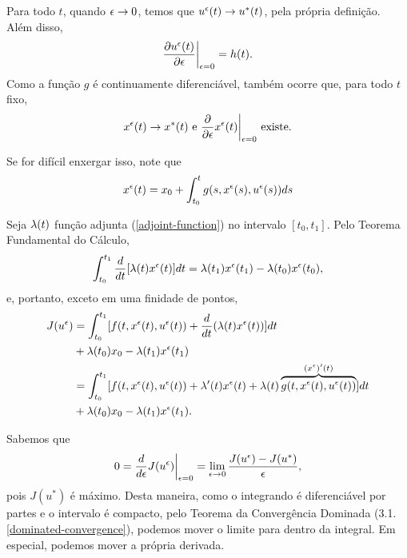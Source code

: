 Para todo $t$, quando $\epsilon \to 0$, temos que $u^{\epsilon}(t) \to u^*(t)$, pela
própria definição. Além disso, 
\begin{equation*}
    \frac{\partial u^{\epsilon}(t)}{\partial \epsilon}\bigg\rvert_{\epsilon = 0} = h(t).
\end{equation*}
Como a função $g$ é continuamente diferenciável, também ocorre que, para todo
$t$ fixo, 
\begin{equation*}
        x^{\epsilon}(t) \to x^*(t) \text{ e }
        \frac{\partial}{\partial \epsilon}x^{\epsilon}(t)\bigg\rvert_{\epsilon = 0} \text{ existe.}
\end{equation*}
\begin{remark}
    Se for difícil enxergar isso, note que 
    $$x^{\epsilon}(t) = x_0 + \int_{t_0}^t
    g(s, x^{\epsilon}(s), u^{\epsilon}(s))ds$$
\end{remark}
Seja $\lambda(t)$ função adjunta (\ref{adjoint-function}) no intervalo $[t_0, t_1]$. Pelo Teorema Fundamental do Cálculo, 
\begin{equation*}
    \int_{t_0}^{t_1} \frac{d}{dt}[\lambda(t)x^{\epsilon}(t)]dt = \lambda(t_1)x^{\epsilon}(t_1) - \lambda(t_0)x^{\epsilon}(t_0),
\end{equation*}
e, portanto, exceto em uma finidade de pontos,
\begin{equation*}
    \begin{split}
        J(u^{\epsilon}) &= \int_{t_0}^{t_1} [f(t,x^{\epsilon}(t), u^{\epsilon}(t)) + \frac{d}{dt}(\lambda(t)x^{\epsilon}(t))]dt \\
        &+ \lambda(t_0)x_0 - \lambda(t_1)x^{\epsilon}(t_1) \\
        &= \int_{t_0}^{t_1} [f(t, x^{\epsilon}(t), u^{\epsilon}(t)) + \lambda '(t)x^{\epsilon}(t) + \lambda(t)\overbrace{g(t,x^{\epsilon}(t), u^{\epsilon}(t))}^{(x^{\epsilon})'(t)}] dt \\
        &+ \lambda(t_0)x_0 - \lambda(t_1)x^{\epsilon}(t_1).
    \end{split}
\end{equation*}

Sabemos que 
\begin{equation*}
    0 = \frac{d}{d\epsilon} J(u^{\epsilon})\bigg\rvert_{\epsilon = 0} = \lim_{\epsilon \to 0} \frac{J(u^{\epsilon}) - J(u^{*})}{\epsilon}, 
\end{equation*}
pois $J(u^*)$ é máximo. Desta maneira, como o integrando é diferenciável por
partes e o intervalo é compacto, pelo Teorema da Convergência Dominada
(3.1.\ref{dominated-convergence}), podemos mover o limite para dentro da
integral. Em especial, podemos mover a própria derivada. 

